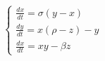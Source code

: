 \documentclass[a4paper, 12pt]{article}
\begin{document}
\begin{equation}
	\label{eq:n1}
	\begin{cases}
		\frac{dx}{dt} = \sigma(y - x)\\
		\frac{dy}{dt} = x({\rho} - z) - y\\
		\frac{dx}{dt} = xy - {\beta}z
	\end{cases}
\end{equation}
\end{document}
